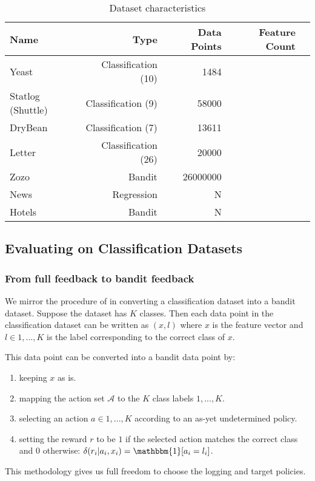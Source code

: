 \documentclass[sigplan,screen]{acmart}
\begin{document}
\begin{table*}
  \caption{Dataset characteristics}
  \label{Dataset-characteristics}
\begin{tabular}{lrrrr}
\toprule
Name & Type & Data Points  & Feature Count  \\ 
\midrule
Yeast & Classification (10) & 1484 &   \\
Statlog (Shuttle) &  Classification (9) & 58000 & \\
DryBean & Classification (7) & 13611 &  \\
Letter & Classification (26) & 20000  &  \\
Zozo & Bandit & 26000000 &  \\
News  & Regression & N &  \\
Hotels & Bandit & N & \\
\bottomrule
\end{tabular}
\end{table*}

\subsection{Evaluating on Classification Datasets}
\subsubsection{From full feedback to bandit feedback}
We mirror the procedure of \cite{dudik} in converting a classification dataset into a bandit dataset. Suppose the dataset has $K$ classes. Then each data point in the classification dataset can be written as $(x, l)$ where $x$ is the feature vector and $l \in {1,...,K}$ is the label corresponding to the correct class of $x$. 

This data point can be converted into a bandit data point by:

\begin{enumerate}
    \item keeping $x$ as is.
    \item mapping the action set $\mathcal{A}$ to the $K$ class labels ${1,...,K}$.
    \item selecting an action $a \in {1, ..., K}$ according to an as-yet undetermined policy.
    \item setting the reward $r$ to be $1$ if the selected action matches the correct class and $0$ otherwise: $\delta(r_i|a_i,x_i) = \mathbbm{1}[a_i = l_i]$.
\end{enumerate}

This methodology gives us full freedom to choose the logging and target policies.
\end{document}
